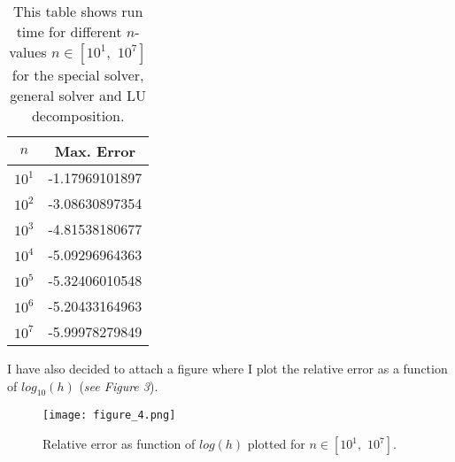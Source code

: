 \documentclass{scrartcl}
\begin{document}
\begin{table}[!htbp]
 \centering
 \begin{tabular}{c|c}
   \toprule
   $n$ & Max. Error\\
   \midrule
   $10^1$ & -1.17969101897\\
   $10^2$ & -3.08630897354\\
   $10^3$ & -4.81538180677\\
   $10^4$ & -5.09296964363\\
   $10^5$ & -5.32406010548\\
   $10^6$ & -5.20433164963\\
   $10^7$ & -5.99978279849\\
   \bottomrule
 \end{tabular}
 \caption{This table shows run time for different $n$-values $n\in [10^1,\,\,10^7]$ for the special solver, general solver and LU decomposition.}
 \label{tab:table2}
\end{table}
I have also decided to attach a figure where I plot the relative error as a function of $log_{10}(h)$ (\textit{see Figure 3}).\par
\begin{figure}[!htbp]
\centering
\texttt{[image: figure\_4.png]}
\caption{Relative error as function of $log(h)$ plotted for $n\in[10^1,\,\,10^7]$.
\label{overflow}}
\end{figure}
\end{document}
